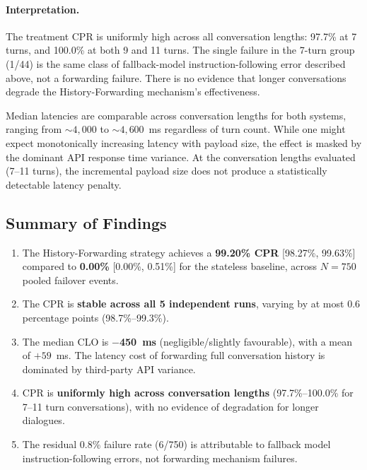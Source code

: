 \paragraph{Interpretation.}
The treatment CPR is uniformly high across all conversation lengths: 97.7\% at 7 turns, and 100.0\% at both 9 and 11 turns. The single failure in the 7-turn group (1/44) is the same class of fallback-model instruction-following error described above, not a forwarding failure. There is no evidence that longer conversations degrade the History-Forwarding mechanism's effectiveness.

Median latencies are comparable across conversation lengths for both systems, ranging from ${\sim}4{,}000$ to ${\sim}4{,}600$~ms regardless of turn count. While one might expect monotonically increasing latency with payload size, the effect is masked by the dominant API response time variance. At the conversation lengths evaluated (7--11 turns), the incremental payload size does not produce a statistically detectable latency penalty.

\subsection{Summary of Findings}

\begin{enumerate}
    \item The History-Forwarding strategy achieves a \textbf{99.20\% CPR} [98.27\%, 99.63\%] compared to \textbf{0.00\%} [0.00\%, 0.51\%] for the stateless baseline, across $N = 750$ pooled failover events.
    \item The CPR is \textbf{stable across all 5 independent runs}, varying by at most 0.6 percentage points (98.7\%--99.3\%).
    \item The median CLO is \textbf{$-$450~ms} (negligible/slightly favourable), with a mean of $+59$~ms. The latency cost of forwarding full conversation history is dominated by third-party API variance.
    \item CPR is \textbf{uniformly high across conversation lengths} (97.7\%--100.0\% for 7--11 turn conversations), with no evidence of degradation for longer dialogues.
    \item The residual 0.8\% failure rate (6/750) is attributable to fallback model instruction-following errors, not forwarding mechanism failures.
\end{enumerate}
